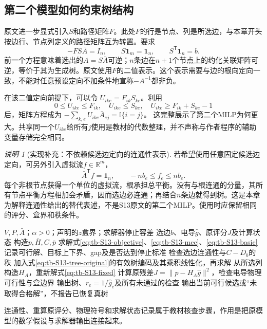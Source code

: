\documentclass[UTF8,11pt,fontset=fandol,openany,oneside]{ctexbook}
\theoremstyle{definition}
\theoremstyle{remark}
\newtheorem{remark}[theorem]{说明}
\numberwithin{equation}{chapter}
\begin{document}
\subsection{第二个模型如何约束树结构}

原文进一步显式引入$S$和路径矩阵$F$。此处$F$的行是节点、列是所选边，与本章开头按边行、节点列定义的路径矩阵互为转置。要求
\begin{equation}
 -FS\bar A=I_n,\qquad
 S\mathbf1_m=\mathbf1_n,\qquad
 S^{\mathsf T}\mathbf1_n=b.
 \label{eq:tb-S13-tree-original}
\end{equation}
前一个方程意味着选出的$A=S\bar A$可逆；$n$条边在$n+1$个节点上的约化关联矩阵可逆，等价于其为生成树。原文使用$F$的二值表示。这个表示需要与边的根向定向一致，不能对任意预设定向不加条件地宣称$-A^{-1}$都非负。

在该二值定向前提下，可以令
$U_{ike}=F_{ik}S_{ke}$。利用
\[
 0\leq U_{ike}\leq F_{ik},\quad
 U_{ike}\leq S_{ke},\quad
 U_{ike}\geq F_{ik}+S_{ke}-1
\]
后，矩阵方程成为
$-\sum_{k,e}U_{ike}\bar A_{ej}=\mathbb I\{i=j\}$。
这完整展示了第二个MILP为何更大。共享同一个$U_{ike}$给所有$j$使用是教材的代数整理，并不声称与作者程序的辅助变量存储完全相同。

\begin{remark}[实现补充：不依赖候选边定向的连通性表示]
若希望使用任意固定候选边定向，可另外引入虚拟流$f\in\mathbb R^m$，
\begin{equation}
 \bar A^{\mathsf T}f=\mathbf1_n,\qquad -nb_e\leq f_e\leq nb_e.
 \label{eq:tb-S13-flow-extra}
\end{equation}
每个非根节点获得一个单位的虚拟流，根承担总平衡。没有与根连通的分量，其所有节点平衡方程相加会矛盾，因而选边必连通；再结合$n$条边就得到树。这是本章为解释连通性给出的替代表述，不是S13原文的第二个MILP。使用时应保留相同的评分、盒界和秩条件。
\end{remark}

\begin{algorithm}[htbp]
\caption{S13的两阶段求解流程：原文模型加教材核查步骤}
\label{alg:tb-S13}
\begin{algorithmic}[1]
\Require $V,P,\bar A$；$\alpha>0$；声明的$z$盒界；求解器停止容差
\Ensure 选边$b$、电导$\widehat g$、原评分$J$及计算状态
\State 构造$p,\bar H,C,\bar p$
\State 求解式\eqref{eq:tb-S13-objective}、\eqref{eq:tb-S13-mcc}、\eqref{eq:tb-S13-basic}
\State 记录可行解、目标上下界、gap及是否达到停止标准
\State 检查选边连通性与$C-D_b$的秩
 \State 加入式\eqref{eq:tb-S13-tree-original}的有效树编码及其乘积线性化，再求解
\EndIf
{}
 \State 从所选列构造$H_A$，重新解式\eqref{eq:tb-S13-fixed}
 \State 计算原残差$J=\|p-H_A\widehat g\|^2$，检查电导物理可行性与盒边界
 \State 输出树、$r_e=1/\widehat g_e$及所有未通过的检查
\Else
 \State 输出当前可行候选或“未取得合格解”，不报告已恢复真树
\EndIf
\end{algorithmic}
\end{algorithm}
连通性、重算原评分、物理符号和求解状态记录属于教材核查步骤，作用是把原模型的数学假设与求解器输出连接起来。
\end{document}

